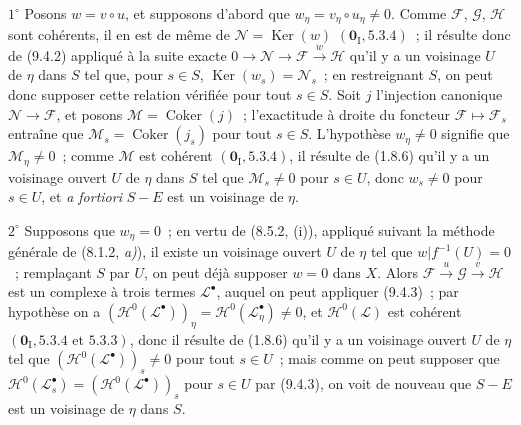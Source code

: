 $1^\circ$ Posons $w=v\circ u$, et supposons d'abord que
$w_\eta=v_\eta\circ u_\eta\neq0$. Comme $\mathcal F$, $\mathcal G$,
$\mathcal H$ sont cohérents, il en est de même de
$\mathcal N=\operatorname{Ker}(w)$ $(\mathbf 0_{\mathrm I},5.3.4)$~; il
résulte donc de (9.4.2) appliqué à la suite exacte
$0\to\mathcal N\to\mathcal F\xrightarrow{w}\mathcal H$ qu'il y a un
voisinage $U$ de $\eta$ dans $S$ tel que, pour $s\in S$,
$\operatorname{Ker}(w_s)=\mathcal N_s$~; en restreignant $S$, on peut donc
supposer cette relation vérifiée pour tout $s\in S$. Soit $j$ l'injection
canonique $\mathcal N\to\mathcal F$, et posons
$\mathcal M=\operatorname{Coker}(j)$~; l'exactitude à droite du foncteur
$\mathcal F\mapsto\mathcal F_s$ entraîne que
$\mathcal M_s=\operatorname{Coker}(j_s)$ pour tout $s\in S$. L'hypothèse
$w_\eta\neq0$ signifie que $\mathcal M_\eta\neq0$~; comme $\mathcal M$ est
cohérent $(\mathbf 0_{\mathrm I},5.3.4)$, il résulte de (1.8.6) qu'il y a un
voisinage ouvert $U$ de $\eta$ dans $S$ tel que $\mathcal M_s\neq0$ pour
$s\in U$, donc $w_s\neq0$ pour $s\in U$, et \emph{a fortiori} $S-E$ est un
voisinage de $\eta$.

$2^\circ$ Supposons que $w_\eta=0$~; en vertu de (8.5.2, (i)), appliqué
suivant la méthode générale de (8.1.2, \emph{a)}), il existe un voisinage
ouvert $U$ de $\eta$ tel que $w|f^{-1}(U)=0$~; remplaçant $S$ par $U$, on peut
déjà supposer $w=0$ dans $X$. Alors
$\mathcal F\xrightarrow{u}\mathcal G\xrightarrow{v}\mathcal H$ est un
complexe à trois termes $\mathcal L^\bullet$, auquel on peut appliquer
(9.4.3)~; par hypothèse on a
$(\mathcal H^0(\mathcal L^\bullet))_\eta=
\mathcal H^0(\mathcal L^\bullet_\eta)\neq0$, et
$\mathcal H^0(\mathcal L)$ est cohérent
$(\mathbf 0_{\mathrm I},5.3.4\text{ et }5.3.3)$, donc il résulte de (1.8.6)
qu'il y a un voisinage ouvert $U$ de $\eta$ tel que
$(\mathcal H^0(\mathcal L^\bullet))_s\neq0$ pour tout $s\in U$~; mais comme
on peut supposer que
$\mathcal H^0(\mathcal L_s^\bullet)=(\mathcal H^0(\mathcal L^\bullet))_s$
pour $s\in U$ par (9.4.3), on voit de nouveau que $S-E$ est un voisinage de
$\eta$ dans $S$.

